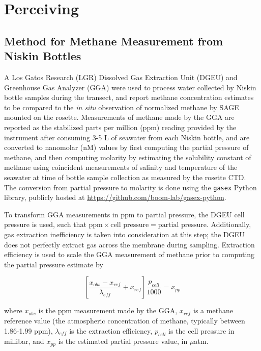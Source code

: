 \chapter{Perceiving}
\label{app:perception}

\section{Method for Methane Measurement from Niskin Bottles}
\label{app:perception:methane}
A Los Gatos Research (LGR) Dissolved Gas Extraction Unit (DGEU) and Greenhouse Gas Analyzer (GGA) were used to process water collected by Niskin bottle samples during the transect, and report methane concentration estimates to be compared to the \emph{in situ} observation of normalized methane by SAGE mounted on the rosette. Measurements of methane made by the GGA are reported as the stabilized parts per million (ppm) reading provided by the instrument after consuming 3-5 L of seawater from each Niskin bottle, and are converted to nanomolar (nM) values by first computing the partial pressure of methane, and then computing molarity by estimating the solubility constant of methane using coincident measurements of salinity and temperature of the seawater at time of bottle sample collection as measured by the rosette CTD. The conversion from partial pressure to molarity is done using the \verb|gasex| Python library, publicly hosted at \url{https://github.com/boom-lab/gasex-python}. 

To transform GGA measurements in ppm to partial pressure, the DGEU cell pressure is used, such that $\text{ppm} \times \text{cell pressure} = \text{partial pressure}$. Additionally, gas extraction inefficiency is taken into consideration at this step; the DGEU does not perfectly extract gas across the membrane during sampling. Extraction efficiency is used to scale the GGA measurement of methane prior to computing the partial pressure estimate by 

\begin{equation}
    \label{eq:extraction}
    \left[\frac{x_{obs} - x_{ref}}{\lambda_{eff}} + x_{ref}\right]\frac{p_{cell}}{1000} = x_{pp}
\end{equation}

\noindent where $x_{obs}$ is the ppm measurement made by the GGA, $x_{ref}$ is a methane reference value (the atmospheric concentration of methane, typically between 1.86-1.99 ppm), $\lambda_{eff}$ is the extraction efficiency, $p_{cell}$ is the cell pressure in millibar, and $x_{pp}$ is the estimated partial pressure value, in $\mu$atm. 

